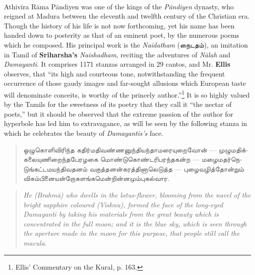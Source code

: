 \documentclass{article}
\newcommand{\TamilText}[1]{\texttamil{#1}}
\newcommand{\tam}[1]{\TamilText{#1}}
\begin{document}
\paragraph{}
Athiv\={i}ra R\={a}ma P\={a}ndiyen was one of the kings of the \emph{P\={a}ndiyen} dynasty, who reigned at Madura between the eleventh and twelfth century of the Christian era. Though the history of his life is not now forthcoming, yet his name has been handed down to posterity as that of an eminent poet, by the numerous poems which he composed. His principal work is the \emph{Naidatham} (\tam{நைடதம்}), an imitation in Tamil of \textbf{Sriharsha's} \emph{Naishadham}, reciting the adventures of \emph{N\={a}lah} and \emph{Damayanti}. It comprises 1171 stanzas arranged in 29 cantos, and Mr. \textbf{Ellis} observes, that ``its high and courteous tone, notwithstanding the frequent occurrence of those gaudy images and far-sought allusions which European taste will denominate conceits, is worthy of the princely author.''\footnote{Ellis' Commentary on the Kural, p. 163.} It is so highly valued by the Tamils for the sweetness of its poetry that they call it ``the nectar of poets,'' but it should be observed that the extreme passion of the author for hyperbole has led him to extravagance, as will be seen by the following stanza in which he celebrates the beauty of \emph{Damayantis's} face.
\begin{quotation}\small
\tam{ஒழுகொளிவிரிந்த கதிர்மதிவண்ணனுந்தியந்தாமரையுறைவோன்‌} --- \tam{முழுமதிக்கலையுணிறைந்தபேரழகை மொண்டுகொண்டரிபரந்தகன்ற} --- \tam{மழைமதர்நெடுங்கட்டமயந்திவதனம்‌ வகுத்தனன்கரத்தினாலெடுத்த} --- \tam{புழைவழித்தோன்றும்‌ விசும்பினையன்றோகளங்கமென்றின்னமும்புகல்வார}.
\end{quotation}
\begin{quotation}\small
\emph{He (Brahm\={a}) who dwells in the lotus-flower, blooming from the navel of the bright sapphire coloured (Vishnu), formed the face of the long-eyed Damayanti by taking his materials from the great beauty which is concentrated in the full moon; and it is the blue sky, which is seen through the aperture made in the moon for this purpose, that people still call the macula.}
\end{quotation}
\end{document}
